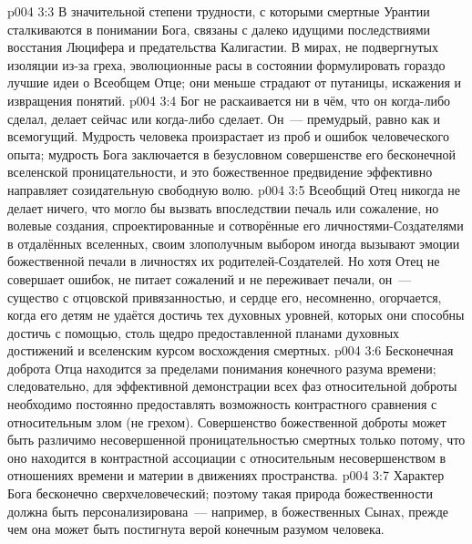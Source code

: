 \vs p004 3:3 \pc В значительной степени трудности, с которыми смертные Урантии сталкиваются в понимании Бога, связаны с далеко идущими последствиями восстания Люцифера и предательства Калигастии. В мирах, не подвергнутых изоляции из\hyp{}за греха, эволюционные расы в состоянии формулировать гораздо лучшие идеи о Всеобщем Отце; они меньше страдают от путаницы, искажения и извращения понятий.
\vs p004 3:4 \pc Бог не раскаивается ни в чём, что он когда\hyp{}либо сделал, делает сейчас или когда\hyp{}либо сделает. Он~--- премудрый, равно как и всемогущий. Мудрость человека произрастает из проб и ошибок человеческого опыта; мудрость Бога заключается в безусловном совершенстве его бесконечной вселенской проницательности, и это божественное предвидение эффективно направляет созидательную свободную волю.
\vs p004 3:5 Всеобщий Отец никогда не делает ничего, что могло бы вызвать впоследствии печаль или сожаление, но волевые создания, спроектированные и сотворённые его личностями\hyp{}Создателями в отдалённых вселенных, своим злополучным выбором иногда вызывают эмоции божественной печали в личностях их родителей\hyp{}Создателей. Но хотя Отец не совершает ошибок, не питает сожалений и не переживает печали, он~--- существо с отцовской привязанностью, и сердце его, несомненно, огорчается, когда его детям не удаётся достичь тех духовных уровней, которых они способны достичь с помощью, столь щедро предоставленной планами духовных достижений и вселенским курсом восхождения смертных.
\vs p004 3:6 Бесконечная доброта Отца находится за пределами понимания конечного разума времени; следовательно, для эффективной демонстрации всех фаз относительной доброты необходимо постоянно предоставлять возможность контрастного сравнения с относительным злом (не грехом). Совершенство божественной доброты может быть различимо несовершенной проницательностью смертных только потому, что оно находится в контрастной ассоциации с относительным несовершенством в отношениях времени и материи в движениях пространства.
\vs p004 3:7 Характер Бога бесконечно сверхчеловеческий; поэтому такая природа божественности должна быть персонализирована~--- например, в божественных Сынах, прежде чем она может быть постигнута верой конечным разумом человека.
